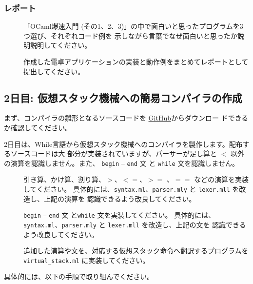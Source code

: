\documentclass[a4paper,11pt]{jsarticle}
\begin{document}
\subsubsection{レポート}

\begin{description}
\item []
  「OCaml爆速入門 (その1、2、3)」の中で面白いと思ったプログラムを3つ選び、それぞれコード例を
示しながら言葉でなぜ面白いと思ったか説明説明してください。
\item []
  作成した電卓アプリケーションの実装と動作例をまとめてレポートとして提出してください。
\end{description}

\subsection{2日目: 仮想スタック機械への簡易コンパイラの作成}

まず、コンパイラの雛形となるソースコードを
\href{https://github.com/tmu-compiler-info-sys-exp-I/compiler-day2}{GitHub}からダウンロー
ドできるか確認してください。

2日目は、While言語から仮想スタック機械へのコンパイラを製作します。配布するソースコードは大
部分が実装されていますが、パーサーが足し算と $<$ 以外の演算を認識しません。また、
\verb|begin| -- \verb|end| 文 と \verb|while| 文を認識しません。

\begin{description}
\item [] 引き算、かけ算、割り算、$>$、$<=$、$>=$ 、$==$ などの演算を実装してください。
  具体的には、\verb|syntax.ml|、\verb|parser.mly| と \verb|lexer.mll| を改造し、上記の演算を
  認識できるよう改良してください。
\item [] \verb|begin| -- \verb|end| 文 と\verb|while| 文を実装してください。
  具体的には、\verb|syntax.ml|、\verb|parser.mly| と \verb|lexer.mll| を改造し、上記の文を
  認識できるよう改良してください。
\item [] 追加した演算や文を、対応する仮想スタック命令へ翻訳するプログラムを
  \verb|virtual_stack.ml| に実装してください。
\end{description}

具体的には、以下の手順で取り組んでください。

\noindent{}
\end{document}
